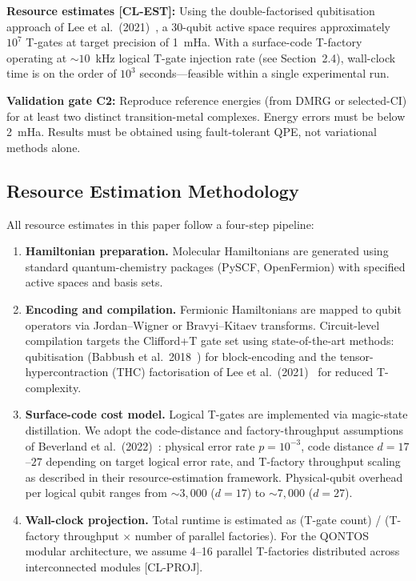 \documentclass[conference]{IEEEtran}
\begin{document}
\textbf{Resource estimates [CL-EST]:} Using the double-factorised qubitisation approach of
Lee et al.\ (2021)~\cite{lee2021}, a 30-qubit active space requires approximately $10^7$ T-gates at
target precision of 1~mHa. With a surface-code T-factory operating at ${\sim}10$~kHz logical
T-gate injection rate (see Section~2.4), wall-clock time is on the order of $10^3$
seconds---feasible within a single experimental run.

\textbf{Validation gate C2:} Reproduce reference energies (from DMRG or selected-CI) for at
least two distinct transition-metal complexes. Energy errors must be below 2~mHa.
Results must be obtained using fault-tolerant QPE, not variational methods alone.

\subsection{Resource Estimation Methodology}

All resource estimates in this paper follow a four-step pipeline:

\begin{enumerate}[leftmargin=*]
\item \textbf{Hamiltonian preparation.} Molecular Hamiltonians are generated using standard
   quantum-chemistry packages (PySCF, OpenFermion) with specified active spaces and
   basis sets.

\item \textbf{Encoding and compilation.} Fermionic Hamiltonians are mapped to qubit operators
   via Jordan--Wigner or Bravyi--Kitaev transforms. Circuit-level compilation targets
   the Clifford+T gate set using state-of-the-art methods: qubitisation
   (Babbush et al.\ 2018~\cite{babbush2018}) for block-encoding and the tensor-hypercontraction (THC)
   factorisation of Lee et al.\ (2021)~\cite{lee2021} for reduced T-complexity.

\item \textbf{Surface-code cost model.} Logical T-gates are implemented via magic-state
   distillation. We adopt the code-distance and factory-throughput assumptions of
   Beverland et al.\ (2022)~\cite{beverland2022}: physical error rate $p = 10^{-3}$, code distance $d = 17$--$27$
   depending on target logical error rate, and T-factory throughput scaling as
   described in their resource-estimation framework. Physical-qubit overhead per
   logical qubit ranges from ${\sim}3{,}000$ ($d{=}17$) to ${\sim}7{,}000$ ($d{=}27$).

\item \textbf{Wall-clock projection.} Total runtime is estimated as (T-gate count) / (T-factory
   throughput $\times$ number of parallel factories). For the QONTOS modular architecture,
   we assume 4--16 parallel T-factories distributed across interconnected modules
   [CL-PROJ].
\end{enumerate}
\end{document}
